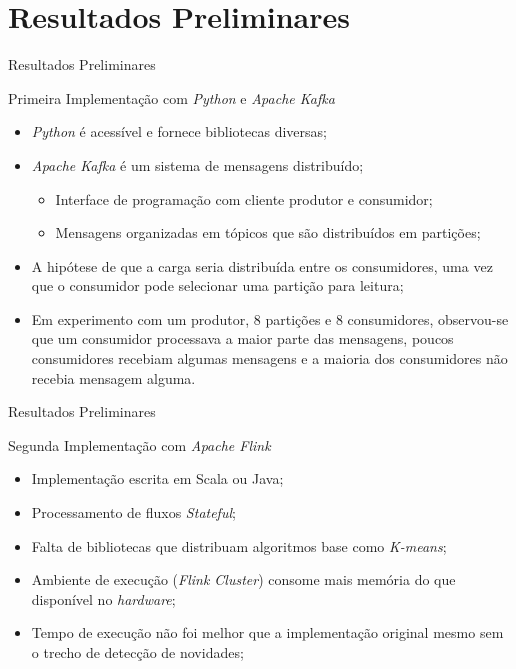 \documentclass[aspectratio=43,10pt]{beamer}
\begin{document}
\section{Resultados Preliminares}
\begin{frame}[fragile]{Resultados Preliminares}

  \begin{alertblock}{Primeira Implementação com \textit{Python} e \textit{Apache Kafka}}
    \begin{itemize}%
      \item \textit{Python} é acessível e fornece bibliotecas diversas;
      \item \textit{Apache Kafka} é um sistema de mensagens distribuído;
      \begin{itemize}
        \item Interface de programação com cliente produtor e consumidor;
        \item Mensagens organizadas em tópicos que são distribuídos em partições;
      \end{itemize}
      \item A hipótese de que a carga seria distribuída entre os consumidores,
      uma vez que o consumidor pode selecionar uma partição para leitura;
      \item Em experimento com um produtor, 8 partições e 8 consumidores,
      observou-se que um consumidor processava a maior parte das mensagens,
      poucos consumidores recebiam algumas mensagens e a maioria dos consumidores
      não recebia mensagem alguma.
    \end{itemize}
  \end{alertblock}
\end{frame}

\begin{frame}[fragile]{Resultados Preliminares}
  \begin{alertblock}{Segunda Implementação com \textit{Apache Flink}}
    \begin{itemize}%
      \item Implementação escrita em Scala ou Java;
      \item Processamento de fluxos \textit{Stateful};
      \item Falta de bibliotecas que distribuam algoritmos base como \textit{K-means};
      \item Ambiente de execução (\textit{Flink Cluster}) consome mais memória do
      que disponível no \textit{hardware};
      \item Tempo de execução não foi melhor que a implementação original mesmo
      sem o trecho de detecção de novidades;
    \end{itemize}
  \end{alertblock}
\end{frame}
\end{document}
